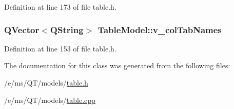 Definition at line 173 of file table.h.

\hypertarget{classTableModel_a8cdd6044f20e1442e77bab8f74a3d2fe}{
\subsubsection[{v\_\-colTabNames}]{\setlength{\rightskip}{0pt plus 5cm}QVector$<$QString$>$ {\bf TableModel::v\_\-colTabNames}}}
\label{classTableModel_a8cdd6044f20e1442e77bab8f74a3d2fe}


Definition at line 153 of file table.h.



The documentation for this class was generated from the following files:\begin{DoxyCompactItemize}
\item 
/e/ms/QT/models/\hyperlink{table_8h}{table.h}\item 
/e/ms/QT/models/\hyperlink{table_8cpp}{table.cpp}\end{DoxyCompactItemize}
